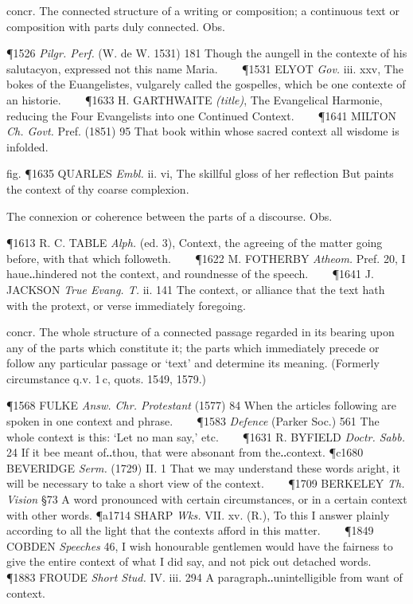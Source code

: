\begin{description}[wide, labelwidth=!, labelindent=0pt]
\begin{myenumerate}
 concr. The connected structure of a writing or composition; a continuous text or composition with parts duly connected. Obs.

\P 1526  \textit{Pilgr. Perf.} (W. de W. 1531) 181 Though the aungell in the contexte of his salutacyon, expressed not this name Maria.    
\P 1531 ELYOT  \textit{Gov.} iii. xxv, The bokes of the Euangelistes, vulgarely called the gospelles, which be one contexte of an historie.    
\P 1633 H. GARTHWAITE  \textit{(title)}, The Evangelical Harmonie, reducing the Four Evangelists into one Continued Context.    
\P 1641 MILTON  \textit{Ch. Govt.} Pref. (1851) 95 That book within whose sacred context all wisdome is infolded.

fig. \P 1635 QUARLES  \textit{Embl.} ii. vi, The skillful gloss of her reflection But paints the context of thy coarse complexion.

 The connexion or coherence between the parts of a discourse. Obs.

\P 1613 R. C. TABLE  \textit{Alph.} (ed. 3), Context, the agreeing of the matter going before, with that which followeth.    
\P 1622 M. FOTHERBY  \textit{Atheom.} Pref. 20, I haue‥hindered not the context, and roundnesse of the speech.    
\P 1641 J. JACKSON  \textit{True Evang. T.} ii. 141 The context, or alliance that the text hath with the protext, or verse immediately foregoing.

 concr. The whole structure of a connected passage regarded in its bearing upon any of the parts which constitute it; the parts which immediately precede or follow any particular passage or ‘text’ and determine its meaning. (Formerly circumstance q.v. 1 c, quots. 1549, 1579.)

\P 1568 FULKE  \textit{Answ. Chr. Protestant} (1577) 84 When the articles following are spoken in one context and phrase.    
\P 1583 \textit{Defence} (Parker Soc.) 561 The whole context is this: ‘Let no man say,’ etc.    
\P 1631 R. BYFIELD  \textit{Doctr. Sabb.} 24 If it bee meant of‥thou, that were absonant from the‥context.
\P c1680 BEVERIDGE  \textit{Serm.} (1729) II. 1 That we may understand these words aright, it will be necessary to take a short view of the context.    
\P 1709 BERKELEY  \textit{Th. Vision} §73 A word pronounced with certain circumstances, or in a certain context with other words.
\P a1714 SHARP  \textit{Wks.} VII. xv. (R.), To this I answer plainly according to all the light that the contexts afford in this matter.    
\P 1849 COBDEN  \textit{Speeches} 46, I wish honourable gentlemen would have the fairness to give the entire context of what I did say, and not pick out detached words.    
\P 1883 FROUDE  \textit{Short Stud.} IV. iii. 294 A paragraph‥unintelligible from want of context.


\end{myenumerate}
\end{description}
